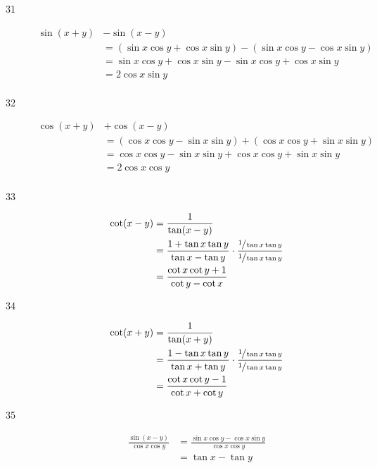 \documentclass{exam}
\begin{document}
\begin{description}
      \item[31] 
        \begin{align*}
          \sin(x + y) & - \sin(x - y) \\
                      & = (\sin x \cos y + \cos x \sin y) - (\sin x \cos y - \cos x \sin y) \\
                      & = \sin x \cos y + \cos x \sin y - \sin x \cos y + \cos x \sin y \\
                      & = 2 \cos x \sin y \\
        \end{align*}

      \item[32] 
        \begin{align*}
          \cos(x + y) & + \cos(x - y) \\
                      & = (\cos x \cos y - \sin x \sin y) + (\cos x \cos y + \sin x \sin y) \\
                      & = \cos x \cos y - \sin x \sin y + \cos x \cos y + \sin x \sin y \\
                      & = 2 \cos x \cos y \\
        \end{align*}

      \item[33] 
        \begin{align*}
          \cot(x - y) & = \frac{1}{\tan(x - y)} \\
                      & = \frac{1 + \tan x \tan y}{\tan x - \tan y} \cdot \frac{\sfrac{1}{\tan x \tan y}}{\sfrac{1}{\tan x \tan y}} \\
                      & = \frac{\cot x \cot y + 1}{\cot y - \cot x} \\
        \end{align*}

      \item[34] 
        \begin{align*}
          \cot(x + y) & = \frac{1}{\tan(x + y)} \\
                      & = \frac{1 - \tan x \tan y}{\tan x + \tan y} \cdot \frac{\sfrac{1}{\tan x \tan y}}{\sfrac{1}{\tan x \tan y}} \\
                      & = \frac{\cot x \cot y - 1}{\cot x + \cot y} \\
        \end{align*}

      \item[35] 
        \begin{align*}
          \frac{\sin(x - y)}{\cos x \cos y} & = \frac{\sin x \cos y - \cos x \sin y}{\cos x \cos y} \\
                                            & = \tan x - \tan y \\
        \end{align*}


\end{description}
\end{document}
